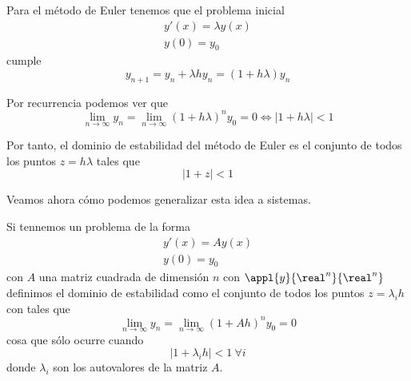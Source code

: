 \begin{example}
Para el método de Euler tenemos que el problema inicial
\[\begin{array}{l}
y'(x)=λy(x) \\
y(0) = y_0
\end{array}\]
cumple
\[y_{n+1}=y_n+λhy_n = (1+hλ)y_n\]

Por recurrencia podemos ver que
\[\lim_{n \to \infty}y_n=\lim_{n \to \infty}(1+hλ)^ny_0 = 0 \iff |1+hλ| < 1\]

Por tanto, el dominio de estabilidad del método de Euler es el conjunto de todos los puntos $z=hλ$ tales que
\[|1+z|<1\]

\end{example}

Veamos ahora cómo podemos generalizar esta idea a sistemas.

\begin{defn}
Si tennemos un problema de la forma
\[\begin{array}{l}
y'(x)=Ay(x) \\
y(0) = y_0
\end{array}\]
con $A$ una matriz cuadrada de dimensión $n$ con $\appl{y}{\real^n}{\real^n}$ definimos el dominio de estabilidad como el conjunto de todos los puntos $z=λ_ih$ con tales que
\[\lim_{n \to \infty} y_n = \lim_{n \to \infty}(1+Ah)^ny_0 = 0\]
cosa que sólo ocurre cuando
\[|1+λ_ih|<1 \ \forall i\]
donde $λ_i$ son los autovalores de la matriz $A$.
\end{defn}